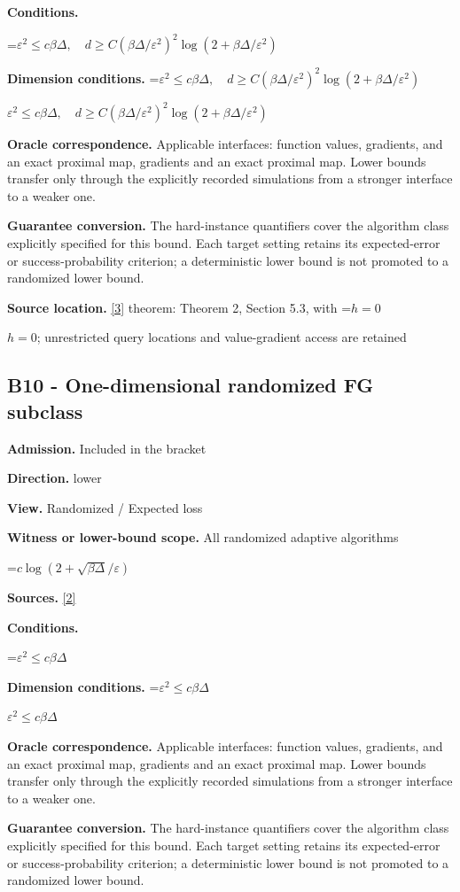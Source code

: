 \documentclass[10pt,a4paper]{article}
\newcommand{\AtlasMath}[1]{\par\begingroup\centering\setbox0=\hbox{$\displaystyle #1$}\ifdim\wd0>1.4\linewidth\typeout{ATLAS WIDE FORMULA: \the\wd0}\fi\ifdim\wd0>\linewidth\resizebox{\linewidth}{!}{\box0}\else\box0\fi\par\endgroup}
\newcommand{\AtlasInlineMath}[1]{\begingroup\setbox0=\hbox{$#1$}\ifdim\wd0>.4\linewidth\endgroup\AtlasMath{#1}\else\endgroup$#1$\fi}
\begin{document}
\textbf{Conditions.} 
\AtlasMath{\varepsilon^2\le c\beta\Delta,\quad d\ge C(\beta\Delta/\varepsilon^2)^2\log(2+\beta\Delta/\varepsilon^2)}


\textbf{Dimension conditions.} \AtlasInlineMath{\varepsilon^2\le c\beta\Delta,\quad d\ge C(\beta\Delta/\varepsilon^2)^2\log(2+\beta\Delta/\varepsilon^2)}

\textbf{Oracle correspondence.} Applicable interfaces: function values, gradients, and an exact proximal map, gradients and an exact proximal map. Lower bounds transfer only through the explicitly recorded simulations from a stronger interface to a weaker one.

\textbf{Guarantee conversion.} The hard-instance quantifiers cover the algorithm class explicitly specified for this bound. Each target setting retains its expected-error or success-probability criterion; a deterministic lower bound is not promoted to a randomized lower bound.

\textbf{Source location.} \href{https://arxiv.org/pdf/1710.11606}{[3]} theorem: Theorem 2, Section 5.3, with \AtlasInlineMath{h=0}; unrestricted query locations and value-gradient access are retained

\subsection{B10 - One-dimensional randomized FG subclass}
\textbf{Admission.} Included in the bracket

\textbf{Direction.} lower

\textbf{View.} Randomized / Expected loss

\textbf{Witness or lower-bound scope.} All randomized adaptive algorithms

\AtlasMath{c\log(2+\sqrt{\beta\Delta}/\varepsilon)}
\textbf{Sources.} \href{https://arxiv.org/pdf/2209.07513}{[2]}

\textbf{Conditions.} 
\AtlasMath{\varepsilon^2\le c\beta\Delta}


\textbf{Dimension conditions.} \AtlasInlineMath{\varepsilon^2\le c\beta\Delta}

\textbf{Oracle correspondence.} Applicable interfaces: function values, gradients, and an exact proximal map, gradients and an exact proximal map. Lower bounds transfer only through the explicitly recorded simulations from a stronger interface to a weaker one.

\textbf{Guarantee conversion.} The hard-instance quantifiers cover the algorithm class explicitly specified for this bound. Each target setting retains its expected-error or success-probability criterion; a deterministic lower bound is not promoted to a randomized lower bound.
\end{document}
